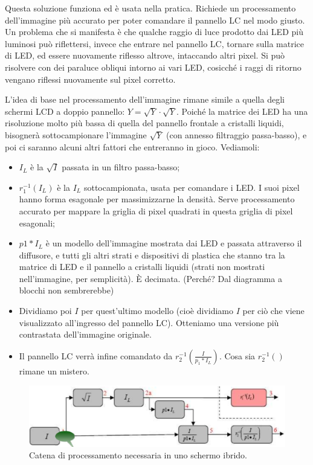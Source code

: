 \documentclass[a4paper,11pt]{article}
\begin{document}
Questa soluzione funziona ed è usata nella pratica. Richiede un processamento dell'immagine
più accurato per poter comandare il pannello LC nel modo giusto. Un problema che si manifesta
è che qualche raggio di luce prodotto dai LED più luminosi può riflettersi, invece che entrare nel pannello LC,
tornare sulla matrice di LED, ed essere nuovamente riflesso altrove, intaccando altri pixel. Si può risolvere con dei
paraluce obliqui intorno ai vari LED, cosicché i raggi di ritorno vengano riflessi nuovamente sul pixel corretto.
\par
L'idea di base nel processamento dell'immagine rimane simile a quella degli schermi LCD a doppio pannello:
$Y = \sqrt{Y} \cdot \sqrt{Y}$. Poiché la matrice dei LED ha una risoluzione molto più bassa di quella del pannello frontale a cristalli liquidi, bisognerà
sottocampionare l'immagine $\sqrt{Y}$ (con annesso filtraggio passa-basso), e poi ci saranno alcuni altri fattori che entreranno in gioco.
Vediamoli:
\begin{itemize}
    \item $I_L$ è la $\sqrt{I}$ passata in un filtro passa-basso;
    \item $r_1^{-1}(I_L)$ è la $I_L$ sottocampionata, usata per comandare i LED. I suoi pixel hanno forma esagonale per massimizzarne la densità. Serve processamento
    accurato per mappare la griglia di pixel quadrati in questa griglia di pixel esagonali;
    \item $p1 \ast I_L$ è un modello dell'immagine mostrata dai LED e passata attraverso il diffusore, e tutti gli altri strati e dispositivi di plastica che stanno tra la
    matrice di LED e il pannello a cristalli liquidi (strati non mostrati nell'immagine, per semplicità). È decimata. (Perché? Dal diagramma a blocchi non sembrerebbe)
    \item Dividiamo poi $I$ per quest'ultimo modello (cioè dividiamo $I$ per ciò che viene visualizzato all'ingresso del pannello LC). Otteniamo una versione più
    contrastata dell'immagine originale.
    \item Il pannello LC verrà infine comandato da $r_2^{-1}(\frac{I}{p_1 \ast I_L})$.
    Cosa sia $r_2^{-1}()$ rimane un mistero.
\end{itemize}

\renewcommand{\thefigure}{4.14}
\begin{figure}[!h]
  \centering
    \includegraphics[scale=0.4]{images/4/hybrid_processing.png}
    \caption{Catena di processamento necessaria in uno schermo ibrido.}
\end{figure}
\end{document}
